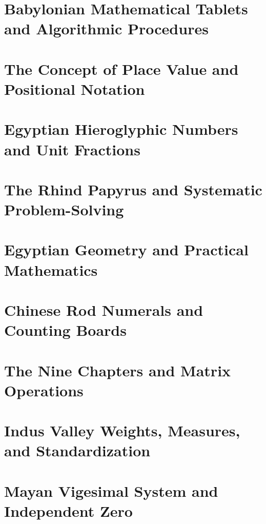 \chapter{Babylonian Mathematical Tablets and Algorithmic Procedures  }
\chapter{The Concept of Place Value and Positional Notation  }
\chapter{Egyptian Hieroglyphic Numbers and Unit Fractions  }
\chapter{The Rhind Papyrus and Systematic Problem-Solving  }
\chapter{Egyptian Geometry and Practical Mathematics  }
\chapter{Chinese Rod Numerals and Counting Boards  }
\chapter{The Nine Chapters and Matrix Operations  }
\chapter{Indus Valley Weights, Measures, and Standardization  }
\chapter{Mayan Vigesimal System and Independent Zero}
